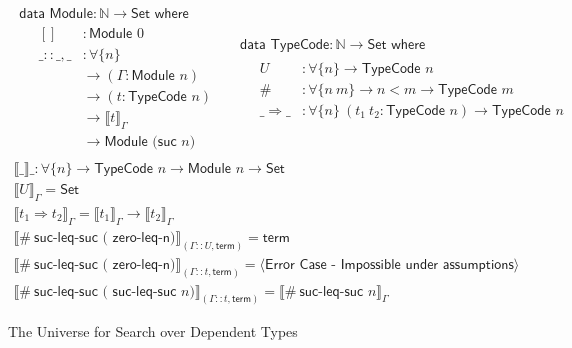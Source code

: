 \documentclass[acmsmall,review,authorversion]{acmart}
\newcommand{\type}[1]{\textsf{#1}}
\newcommand{\Set}{\type{Set}}
\newcommand{\Interp}[1]{\llbracket #1 \rrbracket}
\newcommand{\?}{\stackrel{?}{\approx}}
\newcommand{\data}[2]{\textsf{data } #1 : #2 \textsf{ where}}
\begin{document}
\begin{figure}[t]
  $$
  \begin{array}{cc}
  \begin{array}{l}
    \data{\textsf{Module}}{\mathbb{N} \rightarrow \Set}\\
    \quad \begin{array}{ll}
            []        &: \textsf{Module } 0\\
            \_::\_,\_ &: \forall \{ n \}\\
                      &\rightarrow  (\Gamma : \textsf{Module } n)\\
                      &\rightarrow  (t : \textsf{TypeCode } n)\\
                      &\rightarrow  \Interp{ t }_\Gamma \\
                      &\rightarrow \textsf{Module (suc }  n)
          \end{array}
  \end{array}
                        &
  \begin{array}{l}
    \data{\textsf{TypeCode}}{\mathbb{N} \rightarrow \Set}\\
    \quad
    \begin{array}{ll}
      U &: \forall \{ n \} \rightarrow \textsf{TypeCode } n\\
      \# &: \forall \{ n\ m \} \rightarrow n < m \rightarrow \textsf{TypeCode } m\\
      \_\Rightarrow\_ &: \forall \{ n \}\ (t_1\ t_2 : \textsf{TypeCode } n)
                        \rightarrow \textsf{TypeCode } n
    \end{array}

  \end{array}
  \end{array}
  $$
  $$
  \begin{array}{l}
    \Interp{\_}\_ : \forall \{ n \} \rightarrow \textsf{TypeCode } n \rightarrow
    \textsf{Module } n \rightarrow \Set\\
    \Interp{ U }_\Gamma = \Set\\
    \Interp{ t_1 \Rightarrow t_2 }_\Gamma = \Interp{t_1}_\Gamma \rightarrow \Interp{t_2}_\Gamma\\
    \Interp{ \#\ \textsf{suc-leq-suc ( zero-leq-n)}}_{(\Gamma :: U ,
    \textsf{term})} = \textsf{term}\\
    \Interp{ \#\ \textsf{suc-leq-suc ( zero-leq-n)}}_{(\Gamma :: t ,
    \textsf{term})} = \langle\textsf{Error Case - Impossible under assumptions}\rangle\\
    \Interp{ \#\ \textsf{suc-leq-suc ( suc-leq-suc } n )}_{(\Gamma :: t ,
    \textsf{term})} = \Interp{ \#\ \textsf{suc-leq-suc } n }_\Gamma
  \end{array}
  $$
  \caption{The Universe for Search over Dependent Types}
  \label{fig1}
\end{figure}
\end{document}
